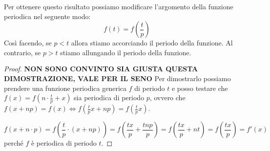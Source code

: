 Per ottenere questo risultato possiamo modificare l'argomento della funzione
periodica nel seguente modo:
\begin{equation}
    f(t) = f\left(\frac{t}{p}\right)
\end{equation}
Così facendo, se $p < t$ allora stiamo accorciando il periodo della funzione. Al
contrario, se $p > t$ stiamo allungando il periodo della funzione.
\begin{proof}
    \textbf{NON SONO CONVINTO SIA GIUSTA QUESTA DIMOSTRAZIONE, VALE PER IL SENO}
    Per dimostrarlo possiamo prendere una funzione periodica generica $f$ di
    periodo $t$ e posso testare che $f(x) = f\left( n \cdot \frac{t}{p} + x\right)$
    sia periodica di periodo $p$, ovvero che $f(x + np) = f(x) \iff
        f\left(\frac{t}{p}x + np\right) = f(\frac{t}{p}x)$.

    \begin{equation*}
        f\left(x + n \cdot p\right) = f\left(\frac{t}{p}\cdot (x + np)\right) =
        f\left(\frac{tx}{p} + \frac{tnp}{p}\right) = f\left(\frac{tx}{p} + nt\right)
        = f\left(\frac{tx}{p}\right) = f'(x)
    \end{equation*}
    perché $f$ è periodica di periodo $t$.
\end{proof}


